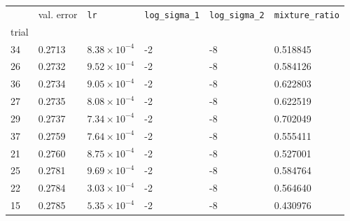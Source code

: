 \begin{tabular}{lp{2.3cm}p{2.3cm}p{2.3cm}p{2.3cm}p{2.3cm}}
\toprule
{} &  val. error &         \texttt{lr} &  \texttt{log\_sigma\_1} &  \texttt{log\_sigma\_2} &  \texttt{mixture\_ratio} \\
trial &             &                     &                         &                         &                          \\
\midrule
34    &      0.2713 & $8.38\times10^{-4}$ &                      -2 &                      -8 &                 0.518845 \\
26    &      0.2732 & $9.52\times10^{-4}$ &                      -2 &                      -8 &                 0.584126 \\
36    &      0.2734 & $9.05\times10^{-4}$ &                      -2 &                      -8 &                 0.622803 \\
27    &      0.2735 & $8.08\times10^{-4}$ &                      -2 &                      -8 &                 0.622519 \\
29    &      0.2737 & $7.34\times10^{-4}$ &                      -2 &                      -8 &                 0.702049 \\
37    &      0.2759 & $7.64\times10^{-4}$ &                      -2 &                      -8 &                 0.555411 \\
21    &      0.2760 & $8.75\times10^{-4}$ &                      -2 &                      -8 &                 0.527001 \\
25    &      0.2781 & $9.69\times10^{-4}$ &                      -2 &                      -8 &                 0.584764 \\
22    &      0.2784 & $3.03\times10^{-4}$ &                      -2 &                      -8 &                 0.564640 \\
15    &      0.2785 & $5.35\times10^{-4}$ &                      -2 &                      -8 &                 0.430976 \\
\bottomrule
\end{tabular}
